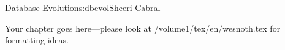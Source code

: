 \begin{aosachapter}{Database Evolution}{s:dbevol}{Sheeri Cabral}

Your chapter goes here---please look at /volume1/tex/en/wesnoth.tex for 
formatting ideas.

\end{aosachapter}
